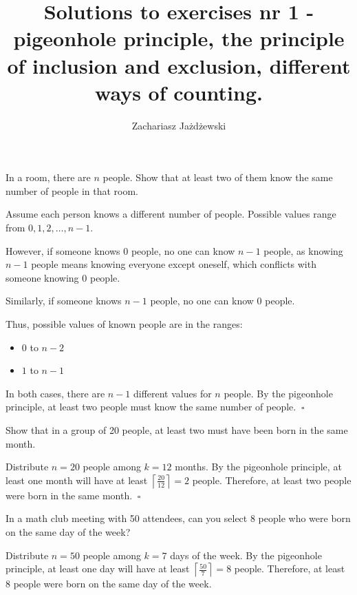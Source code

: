 \documentclass[a4paper,10pt]{article}
\title{\Large{Solutions to exercises nr 1 - pigeonhole principle, the principle of inclusion and exclusion, different ways of counting.}}
\author{Zachariasz Jażdżewski}
\date{}
\begin{document}
\maketitle


\begin{problem}
	In a room, there are \( n \) people. Show that at least two of them know the same number of people in that room.

	Assume each person knows a different number of people. Possible values range \\ from \( 0, 1, 2, \ldots, n-1 \).

	However, if someone knows \( 0 \) people, no one can know \( n-1 \) people, as knowing \( n-1 \) people means knowing everyone except oneself, which conflicts with someone knowing \( 0 \) people. 

	Similarly, if someone knows \( n-1 \) people, no one can know \( 0 \) people.

	Thus, possible values of known people are in the ranges:
	\begin{itemize}
		\item \( 0 \) to \( n-2 \)
		\item \( 1 \) to \( n-1 \)
	\end{itemize}

	In both cases, there are \( n-1 \) different values for \( n \) people. By the pigeonhole principle, at least two people must know the same number of people. \(\ \square \)
\end{problem}

\begin{problem}
	Show that in a group of 20 people, at least two must have been born in the same month.

	Distribute \( n = 20 \) people among \( k = 12 \) months. By the pigeonhole principle, at least one month will have at least \( \left\lceil \frac{20}{12} \right\rceil = 2 \) people. Therefore, at least two people were born in the same month. \(\ \square \)
\end{problem}

\begin{problem}
	In a math club meeting with 50 attendees, can you select 8 people who were born on the same day of the week?

	Distribute \( n = 50 \) people among \( k = 7 \) days of the week. By the pigeonhole principle, at least one day will have at least \( \left\lceil \frac{50}{7} \right\rceil = 8 \) people. Therefore, at least 8 people were born on the same day of the week.
\end{problem}
\end{document}
